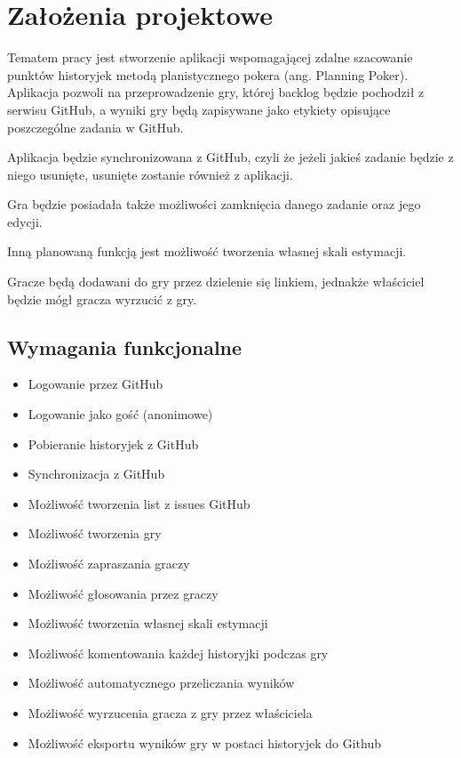 ﻿\chapter{Założenia projektowe}

Tematem pracy jest stworzenie aplikacji wspomagającej zdalne szacowanie punktów historyjek metodą planistycznego pokera (ang. Planning Poker).
Aplikacja pozwoli na przeprowadzenie gry, której backlog będzie pochodził z serwisu GitHub,
a wyniki gry będą zapisywane jako etykiety opisujące poszczególne zadania w GitHub.

Aplikacja będzie synchronizowana z GitHub,
czyli że jeżeli jakieś zadanie będzie z niego usunięte, usunięte zostanie również
z aplikacji.

Gra będzie posiadała także możliwości zamknięcia danego zadanie oraz jego edycji.

Inną planowaną funkcją jest możliwość tworzenia własnej skali estymacji.

Gracze będą dodawani do gry przez dzielenie się linkiem,
jednakże właściciel będzie mógł gracza wyrzucić z gry.

\section{Wymagania funkcjonalne}

\begin{itemize}
    \item Logowanie przez GitHub
    \item Logowanie jako gość (anonimowe)
    \item Pobieranie historyjek z GitHub
    \item Synchronizacja z GitHub
    \item Możliwość tworzenia list z issues GitHub
    \item Możliwość tworzenia gry
    \item Możliwość zapraszania graczy
    \item Możliwość głosowania przez graczy
    \item Możliwość tworzenia własnej skali estymacji
    \item Możliwość komentowania każdej historyjki podczas gry
    \item Możliwość automatycznego przeliczania wyników
    \item Możliwość wyrzucenia gracza z gry przez właściciela
    \item Możliwość eksportu wyników gry w postaci historyjek do Github
\end{itemize}

